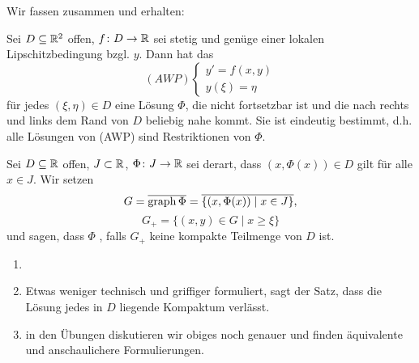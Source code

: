 Wir fassen zusammen und erhalten:
\begin{satz}
	Sei $ D\subseteq\mathbb{R}^2 $ offen, $ f\colon D\rightarrow\mathbb{R} $ sei stetig und gen\"uge einer lokalen Lipschitzbedingung bzgl. $ y $. Dann hat das
	\[ (AWP)\begin{cases}
	y'=f(x,y)\\y(\xi)=\eta
	\end{cases} \]
	f\"ur jedes $ (\xi,\eta)\in D $ eine L\"osung $ \Phi $, die nicht fortsetzbar ist und die nach rechts und links dem Rand von $ D $ beliebig nahe kommt. Sie ist eindeutig bestimmt, d.h. alle L\"osungen von (AWP) sind Restriktionen von $ \Phi $. 
\end{satz}
\begin{definition}
	Sei $ D\subseteq\mathbb{R} $ offen, $ J\subset\mathbb{R} $, $ \Phi\colon J\rightarrow\mathbb{R} $ sei derart, dass $ (x,\Phi(x))\in D $ gilt f\"ur alle $ x\in J $. Wir setzen
	\[ G=\overline{\operatorname{graph}\Phi}=\overline{\lbrace (x,\Phi(x))\mid x\in J\rbrace}, \]  
	\[ G_+=\lbrace(x,y)\in G\mid x\geq\xi\rbrace \]
	und sagen, dass $ \Phi $ , falls $ G_+ $ keine kompakte Teilmenge von $ D $ ist.
\end{definition}
\begin{bemerkung}
	\begin{enumerate}
		\item[]
		\item Etwas weniger technisch und griffiger formuliert, sagt der Satz, dass die L\"osung jedes in $ D $ liegende Kompaktum verl\"asst. 
		\item in den \"Ubungen diskutieren wir obiges noch genauer und finden \"aquivalente und anschaulichere Formulierungen. 
	\end{enumerate}
\end{bemerkung}
